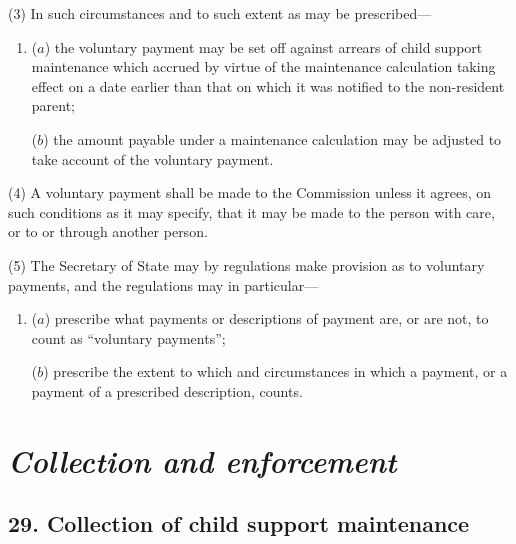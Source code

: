 \documentclass[12pt,a4paper]{article}
\begin{document}
(3) In such circumstances and to such extent as may be prescribed—
\begin{enumerate}\item[]
($a$) the voluntary payment may be set off against arrears of child support maintenance which accrued by virtue of the maintenance calculation taking effect on a date earlier than that on which it was notified to the non-resident parent;

($b$) the amount payable under a maintenance calculation may be adjusted to take account of the voluntary payment.
\end{enumerate}

(4) A voluntary payment shall be made to the 
Commission  %
unless 
it  %
agrees, on such conditions as 
it  %
may specify, that it may be made to the person with care, or to or through another person.

(5) The Secretary of State may by regulations make provision as to voluntary payments, and the regulations may in particular—
\begin{enumerate}\item[]
($a$) prescribe what payments or descriptions of payment are, or are not, to count as “voluntary payments”;

($b$) prescribe the extent to which and circumstances in which a payment, or a payment of a prescribed description, counts.
\end{enumerate}


\section{\itshape Collection and enforcement}

\subsection{29. Collection of child support maintenance}
\end{document}
